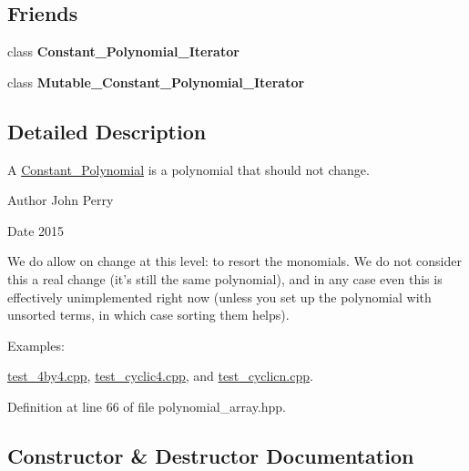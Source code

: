 \subsection*{Friends}
\begin{DoxyCompactItemize}
\item 
\mbox{\label{class_constant___polynomial_ab740f854a3b6a761b4deaf1dc3fc4dbf}} 
class {\bfseries Constant\+\_\+\+Polynomial\+\_\+\+Iterator}
\item 
\mbox{\label{class_constant___polynomial_aefeb273b3b448966d0c8b5041a420d20}} 
class {\bfseries Mutable\+\_\+\+Constant\+\_\+\+Polynomial\+\_\+\+Iterator}
\end{DoxyCompactItemize}


\subsection{Detailed Description}
A \hyperlink{class_constant___polynomial}{Constant\+\_\+\+Polynomial} is a polynomial that should not change. 

\begin{DoxyAuthor}{Author}
John Perry 
\end{DoxyAuthor}
\begin{DoxyDate}{Date}
2015
\end{DoxyDate}
We do allow on change at this level\+: to resort the monomials. We do not consider this a real change (it's still the same polynomial), and in any case even this is effectively unimplemented right now (unless you set up the polynomial with unsorted terms, in which case sorting them helps). \begin{Desc}
\item[Examples\+: ]\par
\hyperlink{test_4by4_8cpp-example}{test\+\_\+4by4.\+cpp}, \hyperlink{test_cyclic4_8cpp-example}{test\+\_\+cyclic4.\+cpp}, and \hyperlink{test_cyclicn_8cpp-example}{test\+\_\+cyclicn.\+cpp}.\end{Desc}


Definition at line 66 of file polynomial\+\_\+array.\+hpp.



\subsection{Constructor \& Destructor Documentation}
\mbox{\label{class_constant___polynomial_a96f87c2544921b04449ef2d92cbec932}} 
